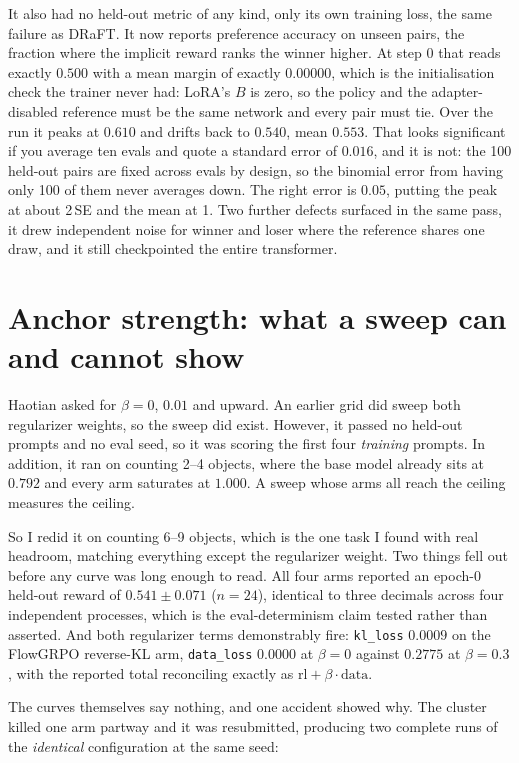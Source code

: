 \documentclass[11pt]{article}
\newcommand{\code}[1]{\texttt{\small #1}}
\begin{document}
It also had no held-out metric of any kind, only its own training loss, the same failure as DRaFT. It now reports preference accuracy on unseen pairs, the fraction where the implicit reward ranks the winner higher. At step 0 that reads exactly $0.500$ with a mean margin of exactly $0.00000$, which is the initialisation check the trainer never had: LoRA's $B$ is zero, so the policy and the adapter-disabled reference must be the same network and every pair must tie. Over the run it peaks at $0.610$ and drifts back to $0.540$, mean $0.553$. That looks significant if you average ten evals and quote a standard error of $0.016$, and it is not: the 100 held-out pairs are fixed across evals by design, so the binomial error from having only 100 of them never averages down. The right error is $0.05$, putting the peak at about 2\,SE and the mean at 1. Two further defects surfaced in the same pass, it drew independent noise for winner and loser where the reference shares one draw, and it still checkpointed the entire transformer.

\section{Anchor strength: what a sweep can and cannot show}

Haotian asked for $\beta = 0$, $0.01$ and upward. An earlier grid did sweep both regularizer weights, so the sweep did exist. However, it passed no held-out prompts and no eval seed, so it was scoring the first four \emph{training} prompts. In addition, it ran on counting 2--4 objects, where the base model already sits at $0.792$ and every arm saturates at $1.000$. A sweep whose arms all reach the ceiling measures the ceiling.

So I redid it on counting 6--9 objects, which is the one task I found with real headroom, matching everything except the regularizer weight. Two things fell out before any curve was long enough to read. All four arms reported an epoch-0 held-out reward of $0.541 \pm 0.071$ ($n{=}24$), identical to three decimals across four independent processes, which is the eval-determinism claim tested rather than asserted. And both regularizer terms demonstrably fire: \code{kl\_loss} $0.0009$ on the FlowGRPO reverse-KL arm, \code{data\_loss} $0.0000$ at $\beta{=}0$ against $0.2775$ at $\beta{=}0.3$, with the reported total reconciling exactly as $\text{rl} + \beta \cdot \text{data}$.

The curves themselves say nothing, and one accident showed why. The cluster killed one arm partway and it was resubmitted, producing two complete runs of the \emph{identical} configuration at the same seed:
\end{document}
